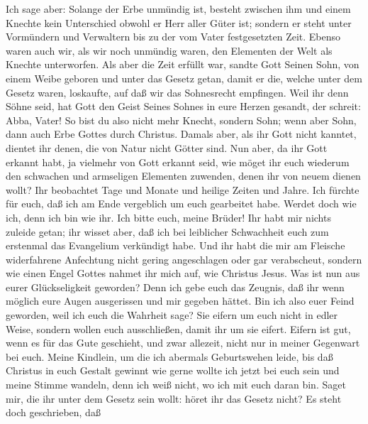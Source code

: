  Ich sage aber: Solange der Erbe unmündig ist, besteht
zwischen ihm und einem Knechte kein Unterschied obwohl er Herr aller
Güter ist;  sondern er steht unter Vormündern und
Verwaltern bis zu der vom Vater festgesetzten Zeit. 
Ebenso waren auch wir, als wir noch unmündig waren, den Elementen der
Welt als Knechte unterworfen.  Als aber die Zeit erfüllt
war, sandte Gott Seinen Sohn, von einem Weibe geboren und unter das
Gesetz getan,  damit er die, welche unter dem Gesetz
waren, loskaufte, auf daß wir das Sohnesrecht empfingen. 
Weil ihr denn Söhne seid, hat Gott den Geist Seines Sohnes in eure
Herzen gesandt, der schreit: Abba, Vater!  So bist du also
nicht mehr Knecht, sondern Sohn; wenn aber Sohn, dann auch Erbe Gottes
durch Christus.  Damals aber, als ihr Gott nicht kanntet,
dientet ihr denen, die von Natur nicht Götter sind.  Nun
aber, da ihr Gott erkannt habt, ja vielmehr von Gott erkannt seid, wie
möget ihr euch wiederum den schwachen und armseligen Elementen zuwenden,
denen ihr von neuem dienen wollt?  Ihr beobachtet Tage
und Monate und heilige Zeiten und Jahre.  Ich fürchte für
euch, daß ich am Ende vergeblich um euch gearbeitet habe.
 Werdet doch wie ich, denn ich bin wie ihr. Ich bitte
euch, meine Brüder! Ihr habt mir nichts zuleide getan; 
ihr wisset aber, daß ich bei leiblicher Schwachheit euch zum erstenmal
das Evangelium verkündigt habe.  Und ihr habt die mir am
Fleische widerfahrene Anfechtung nicht gering angeschlagen oder gar
verabscheut, sondern wie einen Engel Gottes nahmet ihr mich auf, wie
Christus Jesus.  Was ist nun aus eurer Glückseligkeit
geworden? Denn ich gebe euch das Zeugnis, daß ihr wenn möglich eure
Augen ausgerissen und mir gegeben hättet.  Bin ich also
euer Feind geworden, weil ich euch die Wahrheit sage? 
Sie eifern um euch nicht in edler Weise, sondern wollen euch
ausschließen, damit ihr um sie eifert.  Eifern ist gut,
wenn es für das Gute geschieht, und zwar allezeit, nicht nur in meiner
Gegenwart bei euch.  Meine Kindlein, um die ich abermals
Geburtswehen leide, bis daß Christus in euch Gestalt gewinnt
 wie gerne wollte ich jetzt bei euch sein und meine
Stimme wandeln, denn ich weiß nicht, wo ich mit euch daran bin.
 Saget mir, die ihr unter dem Gesetz sein wollt: höret
ihr das Gesetz nicht?  Es steht doch geschrieben, daß
